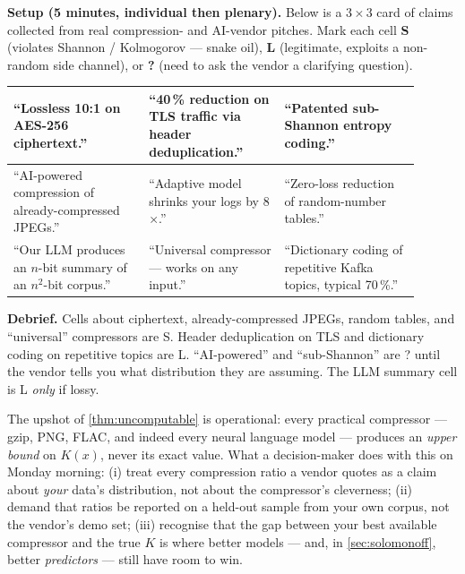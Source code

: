 \begin{activity}[title={Activity 3 --- Snake-oil bingo}]
\label{act:bingo}
\textbf{Setup (5 minutes, individual then plenary).}  Below is a
$3\times 3$ card of claims collected from real compression- and
AI-vendor pitches.  Mark each cell \textbf{S} (violates Shannon /
Kolmogorov --- snake oil), \textbf{L} (legitimate, exploits a
non-random side channel), or \textbf{?} (need to ask the vendor a
clarifying question).

\begin{center}
\small
\begin{tabular}{|p{0.3\linewidth}|p{0.3\linewidth}|p{0.3\linewidth}|}
\hline
``Lossless 10:1 on AES-256 ciphertext.'' &
``40\,\% reduction on TLS traffic via header deduplication.'' &
``Patented sub-Shannon entropy coding.'' \\
\hline
``AI-powered compression of already-compressed JPEGs.'' &
``Adaptive model shrinks your logs by 8$\times$.'' &
``Zero-loss reduction of random-number tables.'' \\
\hline
``Our LLM produces an $n$-bit summary of an $n^2$-bit corpus.'' &
``Universal compressor --- works on any input.'' &
``Dictionary coding of repetitive Kafka topics, typical 70\,\%.'' \\
\hline
\end{tabular}
\end{center}

\textbf{Debrief.}  Cells about ciphertext, already-compressed JPEGs,
random tables, and ``universal'' compressors are S.  Header
deduplication on TLS and dictionary coding on repetitive topics are L.
``AI-powered'' and ``sub-Shannon'' are ? until the vendor tells you
what distribution they are assuming.  The LLM summary cell is L
\emph{only} if lossy.
\end{activity}

\medskip

The upshot of \cref{thm:uncomputable} is operational: every practical
compressor --- gzip, PNG, FLAC, and indeed every neural language model
--- produces an \emph{upper bound} on $K(x)$, never its exact value.
What a decision-maker does with this on Monday morning: (i) treat
every compression ratio a vendor quotes as a claim about \emph{your}
data's distribution, not about the compressor's cleverness; (ii)
demand that ratios be reported on a held-out sample from your own
corpus, not the vendor's demo set; (iii) recognise that the gap
between your best available compressor and the true $K$ is where
better models --- and, in \cref{sec:solomonoff}, better
\emph{predictors} --- still have room to win.
